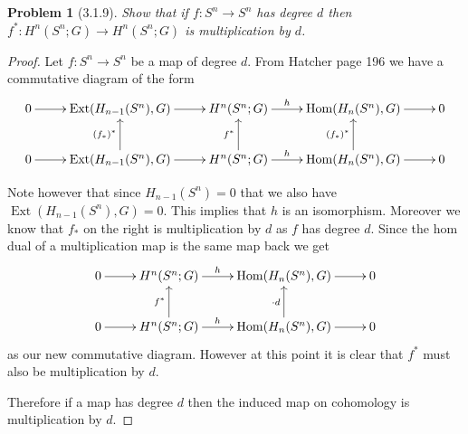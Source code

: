 \documentclass[10pt]{article}
\newcommand{\sk}{\vskip 10mm}
\DeclareMathOperator{\Ext}{Ext}
\DeclareMathOperator{\Hom}{Hom}
\theoremstyle{plain}
\newtheorem{problem}{Problem}
\theoremstyle{remark}
\begin{document}
\sk

\begin{problem}[3.1.9]
  Show that if $f:S^n\rightarrow S^n$ has degree $d$ then
  $f^*:H^n(S^n;G)\rightarrow H^n(S^n;G)$ is multiplication by $d$.
\end{problem}

\begin{proof}
  Let $f:S^n\rightarrow S^n$ be a map of degree $d$. From Hatcher page 196 we have a
  commutative diagram of the form
  \[
    \xymatrix{
      0 \ar[r] & \Ext(H_{n-1}(S^n),G)\ar[r] & H^n(S^n;G) \ar[r]^-h & \Hom(H_n(S^n),G) \ar[r] & 0\\
      0 \ar[r] & \Ext(H_{n-1}(S^n),G)\ar[r]\ar[u]^{(f_*)^*} & H^n(S^n;G) \ar[r]^-h\ar[u]^{f^*} & \Hom(H_n(S^n),G) \ar[r]\ar[u]^{(f_*)^*} & 0
    }
  \]

  Note however that since $H_{n-1}(S^n)=0$ that we also have $\Ext(H_{n-1}(S^n),G)=0$.
  This implies that $h$ is an isomorphism. Moreover we know that $f_*$ on
  the right is multiplication by $d$ as $f$ has degree $d$. Since the hom
  dual of a multiplication map is the same map back we get
  \[
    \xymatrix{
      0 \ar[r] & H^n(S^n;G) \ar[r]^-h & \Hom(H_n(S^n),G) \ar[r] & 0\\
      0 \ar[r] & H^n(S^n;G) \ar[r]^-h\ar[u]^{f^*} & \Hom(H_n(S^n),G) \ar[r]\ar[u]^{\cdot d} & 0
    }
  \]
  as our new commutative diagram. However at this point it is clear that $f^*$ must
  also be multiplication by $d$.

  Therefore if a map has degree $d$ then the induced map on cohomology is
  multiplication by $d$.
\end{proof}

\end{document}
